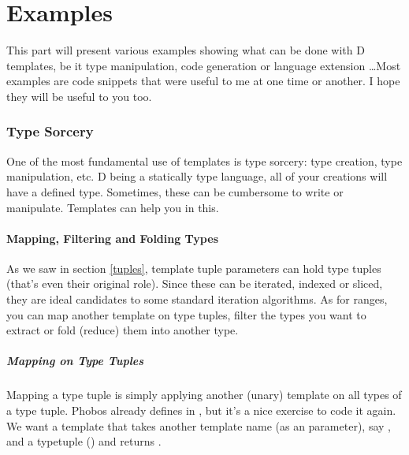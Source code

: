 \newpage
\part{Examples}\label{examples}

This part will present various examples showing what can be done with D templates, be it type manipulation, code generation or language extension \ldots Most examples are code snippets that were useful to me at one time or another. I hope they will be useful to you too.


\section{Type Sorcery}\label{typesorcery}

One of the most fundamental use of templates is type sorcery: type creation, type manipulation, etc. D being a statically type language, all of your creations will have a defined type. Sometimes, these can be cumbersome to write or manipulate. Templates can help you in this.

\subsection{Mapping, Filtering and Folding Types}

As we saw in section \ref{tuples}, template tuple parameters can hold type tuples (that's even their original role). Since these can be iterated, indexed or sliced, they are ideal candidates to some standard iteration algorithms. As for ranges, you can map another template on type tuples, filter the types you want to extract or fold (reduce) them into another type.

\label{andnontypes}

\subsubsection{Mapping on Type Tuples}\label{staticmap}

Mapping a type tuple is simply applying another (unary) template on all types of a type tuple. Phobos already defines  in , but it's a nice exercise to code it again. We want a template that takes another template name (as an  parameter), say , and a typetuple () and returns .

